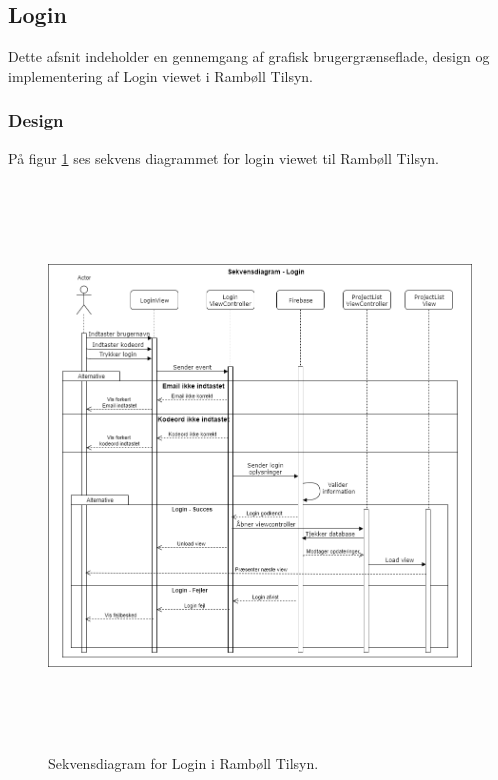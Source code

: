 \subsection{Login}
Dette afsnit indeholder en gennemgang af grafisk brugergrænseflade, design og implementering af Login viewet i Rambøll Tilsyn.

\subsubsection{Design}
På figur \ref{fig:LoginSekvens} ses sekvens diagrammet for login viewet til Rambøll Tilsyn.
\begin{figure}[H] %
	\centering
	\includegraphics[height=15cm, width=15cm]{../ArkitekturDesign/Design/Login/LoginSekvensDiagram}
	\caption{Sekvensdiagram for Login i Rambøll Tilsyn.}
	\label{fig:LoginSekvens}
\end{figure}

\clearpage

